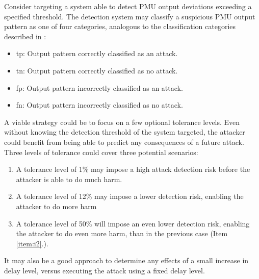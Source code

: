 Consider targeting a system able to detect PMU output deviations exceeding a specified threshold. The detection system may classify a suspicious PMU output pattern as one of four categories, analogous to the classification categories described in \cite[p. 5]{kunang2021attack}: 
\begin{itemize}
    \item \acrfull{tp}: Output pattern correctly classified as an attack.
    \item \acrfull{tn}:  Output pattern correctly classified as no attack.
    \item \acrfull{fp}: Output pattern incorrectly classified as an attack.
    \item \acrfull{fn}: Output pattern incorrectly classified as no attack.

\end{itemize}

 
A viable strategy could be to focus on a few optional tolerance levels. Even without knowing the detection threshold of the system targeted, the attacker could benefit from being able to predict any consequences of a future attack. Three levels of tolerance could cover three potential scenarios:
\begin{enumerate}
    \item A tolerance level of 1\% may impose a high attack detection risk before the attacker is able to do much harm.
    \item A tolerance level of 12\% may impose a lower detection risk, enabling the attacker to do more harm
\label{item:i2}    \item A tolerance level of 50\% will impose an even lower detection risk, enabling the attacker to do even more harm, than in the previous case (Item \ref{item:i2}.).
    
\end{enumerate}

It may also be a good approach to determine any effects of a small increase in delay level, versus executing the attack using a fixed delay level.

